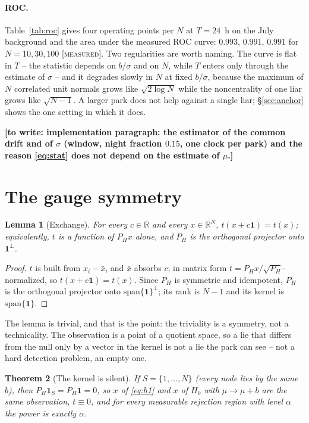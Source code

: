 \documentclass[10pt,twocolumn,a4paper]{article}
\newcommand{\measured}{\textcolor{blue!70!black}{\textsc{[measured]}}}
\newcommand{\gap}[1]{\textcolor{red!70!black}{\textbf{[to write: #1]}}}
\newtheorem{theorem}{Theorem}[section]
\newtheorem{lemma}[theorem]{Lemma}
\theoremstyle{definition}
\theoremstyle{remark}
\newcommand{\PH}{P_{H}}
\newcommand{\one}{\mathbf{1}}
\newcommand{\R}{\mathbb{R}}
\begin{document}
\paragraph{ROC.} Table~\ref{tab:roc} gives four operating points per $N$ at
$T=24$~h on the July background and the area under the measured ROC curve:
$0.993$, $0.991$, $0.991$ for $N=10,30,100$ \measured. Two regularities are worth
naming. The curve is flat in $T$ -- the statistic depends on $b/\sigma$ and on
$N$, while $T$ enters only through the estimate of $\sigma$ -- and it degrades
slowly in $N$ at fixed $b/\sigma$, because the maximum of $N$ correlated unit
normals grows like $\sqrt{2\log N}$ while the noncentrality of one liar grows
like $\sqrt{N-1}$. A larger park does not help against a single liar;
\S\ref{sec:anchor} shows the one setting in which it does.



\gap{implementation paragraph: the estimator of the common drift and of $\sigma$
(window, night fraction $0.15$, one clock per park) and the reason
\eqref{eq:stat} does not depend on the estimate of $\mu$.}

\section{The gauge symmetry}
\label{sec:theorem}

\begin{lemma}[Exchange]
\label{lem:gauge}
For every $c\in\R$ and every $x\in\R^N$, $t(x+c\one)=t(x)$; equivalently, $t$ is
a function of $\PH x$ alone, and $\PH$ is the orthogonal projector onto
$\one^{\perp}$.
\end{lemma}

\begin{proof}
$t$ is built from $x_i-\bar x$, and $\bar x$ absorbs $c$; in matrix form
$t=\PH x/\sqrt{\PH}$-normalized, so $t(x+c\one)=t(x)$. Since $\PH$ is symmetric
and idempotent, $\PH$ is the orthogonal projector onto $\mathrm{span}\{\one\}^\perp$;
its rank is $N-1$ and its kernel is $\mathrm{span}\{\one\}$.
\end{proof}

The lemma is trivial, and that is the point: the triviality is a symmetry, not a
technicality. The observation is a point of a quotient space, so a lie that
differs from the null only by a vector in the kernel is not a lie the park can
see -- not a hard detection problem, an empty one.

\begin{theorem}[The kernel is silent]
\label{thm:kernel}
If $S=\{1,\dots,N\}$ (every node lies by the same $b$), then
$\PH\one_S=\PH\one=0$, so $x$ of \eqref{eq:h1} and $x$ of $H_0$ with
$\mu\to\mu+b$ are the same observation, $t\equiv0$, and for every measurable
rejection region with level $\alpha$ the power is exactly $\alpha$.
\end{theorem}
\end{document}
